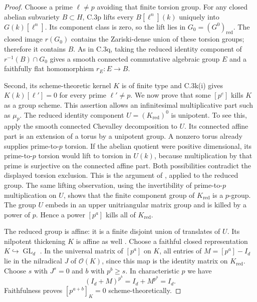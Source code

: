 \begin{proof}
Choose a prime $\ell\ne p$ avoiding that finite torsion group.
For any closed abelian subvariety $B\subset H$, C.3p lifts
every $B[\ell^n](k)$ uniquely into $G(k)[\ell^n]$.
Its component class is zero, so the lift lies in
$G_0=(G^0)_{\mathrm{red}}$. The closed image $r(G_0)$
contains the Zariski-dense union of these torsion groups;
therefore it contains $B$. As in C.3q, taking the reduced
identity component of $r^{-1}(B)\cap G_0$ gives a smooth
connected commutative algebraic group $E$ and a faithfully
flat homomorphism $r_E:E\to B$.

Second, its scheme-theoretic kernel $K$ is of finite type
and C.3k(i) gives $K(k)[\ell']=0$ for every prime
$\ell'\ne p$. We now prove that some $[p^e]$ kills $K$
as a group scheme. This assertion allows an infinitesimal
multiplicative part such as $\mu_p$.
The reduced identity component $U=(K_{\mathrm{red}})^0$
is unipotent. To see this, apply the smooth connected
Chevalley decomposition to $U$. Its connected affine
part is an extension of a torus by a unipotent group.
A nonzero torus already supplies prime-to-$p$ torsion.
If the abelian quotient were positive dimensional,
its prime-to-$p$ torsion would lift to torsion in $U(k)$,
because multiplication by that prime is surjective on
the connected affine part. Both possibilities contradict
the displayed torsion exclusion. This is the argument
of \citet[Lemma 2.6 and proof, p.~466]{D_Kollar2016LocalPicard},
applied to the reduced group.
The same lifting observation, using the invertibility
of prime-to-$p$ multiplication on $U$, shows that the
finite component group of $K_{\mathrm{red}}$ is a $p$-group.
The group $U$ embeds in an upper unitriangular matrix
group and is killed by a power of $p$. Hence a power
$[p^a]$ kills all of $K_{\mathrm{red}}$.

The reduced group is affine: it is a finite disjoint
union of translates of $U$. Its nilpotent thickening
$K$ is affine as well
\citep[Lemma 37.2.3, Tag 06AD]{rootStacksRegularApproximation}.
Choose a faithful closed representation $K\hookrightarrow
\operatorname{GL}_d$
\citep[Theorem 4.9 and Corollary 4.10, p.~87]
{rootMilneAlgebraicGroups2022}.
In the universal matrix of $[p^a]$ on $K$, all entries
of $M=[p^a]-I_d$ lie in the nilradical $J$ of $\mathcal O(K)$,
since this map is the identity matrix on $K_{\mathrm{red}}$.
Choose $s$ with $J^s=0$ and $b$ with $p^b\ge s$.
In characteristic $p$ we have
\[
                    (I_d+M)^{p^b}=I_d+M^{p^b}=I_d.
\]
Faithfulness proves $[p^{a+b}]_K=0$ scheme-theoretically.


\end{proof}
